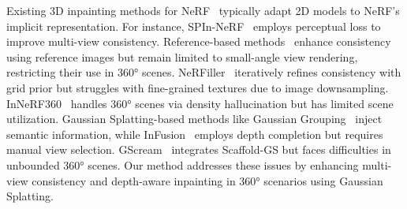 \vspace{3pt}
Existing 3D inpainting methods for NeRF~\cite{weder2022removing, spinnerf, shen2023nerfin, yin2023or} typically adapt 2D models to NeRF’s implicit representation. For instance, SPIn-NeRF~\cite{spinnerf} employs perceptual loss to improve multi-view consistency. Reference-based methods~\cite{mirzaei2023reference, mirzaei2024reffusionreferenceadapteddiffusion, wang2024gscream} enhance consistency using reference images but remain limited to small-angle view rendering, restricting their use in 360° scenes. NeRFiller~\cite{weber2023nerfiller} iteratively refines consistency with grid prior but struggles with fine-grained textures due to image downsampling. InNeRF360~\cite{wang2023inpaintnerf360} handles 360° scenes via density hallucination but has limited scene utilization.
% 
Gaussian Splatting-based methods like Gaussian Grouping~\cite{ye2023gaussian} inject semantic information, while InFusion~\cite{liu2024infusion} employs depth completion but requires manual view selection. GScream~\cite{scaffoldgs} integrates Scaffold-GS but faces difficulties in unbounded 360° scenes. Our method addresses these issues by enhancing multi-view consistency and depth-aware inpainting in 360° scenarios using Gaussian Splatting.
